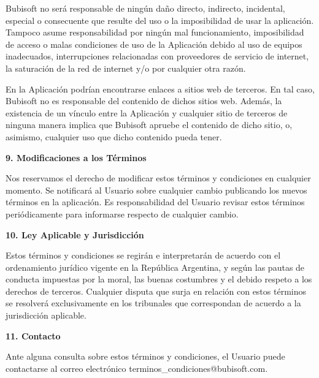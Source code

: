 \documentclass[a4paper,12pt]{article}
\newcommand{\saltolinea}{\par\vspace{\baselineskip}}
\begin{document}
    \saltolinea
    \par Bubisoft no será responsable de ningún daño directo, indirecto, incidental, especial o consecuente que resulte del uso o la imposibilidad de usar la aplicación. Tampoco asume responsabilidad por ningún mal funcionamiento, imposibilidad de acceso o malas condiciones de uso de la Aplicación debido al uso de equipos inadecuados, interrupciones relacionadas con proveedores de servicio de internet, la saturación de la red de internet y/o por cualquier otra razón.
    \par En la Aplicación podrían encontrarse enlaces a sitios web de terceros. En tal caso, Bubisoft no es responsable del contenido de dichos sitios web. Además, la existencia de un vínculo entre la Aplicación y cualquier sitio de terceros de ninguna manera implica que Bubisoft apruebe el contenido de dicho sitio, o, asimismo, cualquier uso que dicho contenido pueda tener. 
    \saltolinea
    \par \textbf{9. Modificaciones a los Términos} 
    \saltolinea
    \par Nos reservamos el derecho de modificar estos términos y condiciones en cualquier momento. Se notificará al Usuario sobre cualquier cambio publicando los nuevos términos en la aplicación. Es responsabilidad del Usuario revisar estos términos periódicamente para informarse respecto de cualquier cambio. 
    \saltolinea
    \par \textbf{10. Ley Aplicable y Jurisdicción} 
    \saltolinea
    \par Estos términos y condiciones se regirán e interpretarán de acuerdo con el ordenamiento jurídico vigente en la República Argentina, y según las pautas de conducta impuestas por la moral, las buenas costumbres y el debido respeto a los derechos de terceros. Cualquier disputa que surja en relación con estos términos se resolverá exclusivamente en los tribunales que correspondan de acuerdo a la jurisdicción aplicable. 
    \saltolinea
    \par \textbf{11. Contacto} 
    \saltolinea
    \par Ante alguna consulta sobre estos términos y condiciones, el Usuario puede contactarse al correo electrónico terminos\_condiciones@bubisoft.com.
\end{document}
